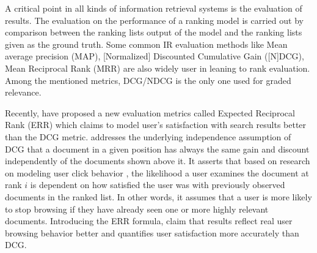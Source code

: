 A critical point in all kinds of information retrieval systems is the evaluation of results. The evaluation on the performance of a ranking model is carried out by comparison between the ranking lists output of the model and the ranking lists given as the ground truth. Some common IR evaluation methods like Mean average precision (MAP), [Normalized] Discounted Cumulative Gain ([N]DCG), Mean Reciprocal Rank (MRR) are also widely user in leaning to rank evaluation. Among the mentioned metrics, DCG/NDCG is the only one used for graded relevance.

Recently, \citet{l2r-err} have proposed a new evaluation metrics called Expected Reciprocal Rank (ERR) which claims to model user's satisfaction with search results better than the DCG metric. \citet{l2r-err} addresses the underlying independence assumption of DCG that a document in a given position has always the same gain and discount independently of the documents shown above it. It asserts that based on research on modeling user click behavior \citep{l2r-clickmodel1,l2r-clickmodel2}, the likelihood a user examines the document at rank $i$ is dependent on how satisfied the user was with previously observed documents in the ranked list. In other words, it assumes that a user is more likely to stop browsing if they have already seen one or more highly relevant documents. Introducing the ERR formula, \cite{l2r-err} claim that results reflect real user browsing behavior better and quantifies user satisfaction more accurately than DCG.
